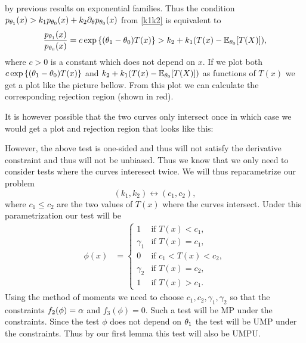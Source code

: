 by previous results on exponential families. Thus the condition $p_{{\theta}_1}(x)>k_1p_{{\theta}_0}(x)+k_2\partial_{\theta} p_{{\theta}_0}(x)$ from \eqref{k1k2} is equivalent to
\[\frac{p_{{\theta}_1}(x)}{p_{{\theta}_0}(x)}=c\exp\left\{({\theta}_1-{\theta}_0)T(x)\right\} > k_2+k_1(T(x)-{\mathbb{E}}_{{\theta}_0}[T(X)]), \]
where $c>0$ is a constant which does not depend on $x$. If we plot both $c\exp\left\{({\theta}_1-{\theta}_0)T(x)\right\}$ and $k_2+k_1(T(x)-{\mathbb{E}}_{{\theta}_0}[T(X)])$ as functions of $T(x)$ we get a plot like the picture bellow. From this plot we can calculate the corresponding rejection region (shown in red).

\begin{center}

\end{center}

It is however possible that the two curves only intersect once in which case we would get a plot and rejection region that looks like this:

\begin{center}
    
\end{center}
However, the above test is one-sided and thus will not satisfy the derivative constraint and thus will not be unbiased. Thus we know that we only need to consider tests where the curves interesect twice. We will thus reparametrize our problem 
\[(k_1,k_2) \longleftrightarrow (c_1,c_2), \]
where $c_1 \le c_2$ are the two values of $T(x)$ where the curves intersect. Under this parametrization our test will be
\begin{align*}
    \phi(x) & =\begin{cases}
        1 & \text{if } T(x) < c_1,\\
        \gamma_1 & \text{if } T(x) = c_1,\\
        0 & \text{if } c_1 < T(x) < c_2,\\
        \gamma_2 & \text{if } T(x) = c_2,\\
        1 & \text{if } T(x) > c_1.
    \end{cases}
\end{align*}
Using the method of moments we need to choose $c_1,c_2,\gamma_1,\gamma_2$ so that the constraints $f_2(\phi)={\alpha}$ and $f_3(\phi)=0$. Such a test will be MP under the constraints. Since the test $\phi$ does not depend on ${\theta}_1$ the test will be UMP under the constraints. Thus by our first lemma this test will also be UMPU. 

